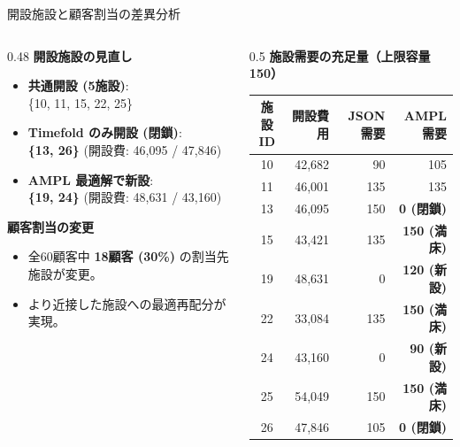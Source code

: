 \documentclass[aspectratio=169,11pt]{beamer}
\begin{document}
\begin{frame}{開設施設と顧客割当の差異分析}
  \begin{columns}[T]
    \begin{column}{0.48\textwidth}
      \textbf{開設施設の見直し}
      \begin{itemize}\footnotesize
        \item \textbf{共通開設 (5施設)}: \\
          \{10, 11, 15, 22, 25\}
        \item \textbf{Timefold のみ開設 (閉鎖)}: \\
          \alert{\textbf{\{13, 26\}}} (開設費: 46,095 / 47,846)
        \item \textbf{AMPL 最適解で新設}: \\
          \alert{\textbf{\{19, 24\}}} (開設費: 48,631 / 43,160)
      \end{itemize}
      \vspace{0.5em}
      \textbf{顧客割当の変更}
      \begin{itemize}\footnotesize
        \item 全60顧客中 \alert{\textbf{18顧客 (30\%)}} の割当先施設が変更。
        \item より近接した施設への最適再配分が実現。
      \end{itemize}
    \end{column}
    \begin{column}{0.5\textwidth}
      \textbf{施設需要の充足量（上限容量 150）}
      \begin{table}\tiny
        \centering
        \begin{tabular}{crrr}
          \toprule
          施設ID & 開設費用 & JSON需要 & AMPL需要 \\
          \midrule
          10 & 42,682 & 90 & 105 \\
          11 & 46,001 & 135 & 135 \\
          13 & 46,095 & 150 & \alert{\textbf{0 (閉鎖)}} \\
          15 & 43,421 & 135 & \textbf{150 (満床)} \\
          19 & 48,631 & 0 & \alert{\textbf{120 (新設)}} \\
          22 & 33,084 & 135 & \textbf{150 (満床)} \\
          24 & 43,160 & 0 & \alert{\textbf{90 (新設)}} \\
          25 & 54,049 & 150 & \textbf{150 (満床)} \\
          26 & 47,846 & 105 & \alert{\textbf{0 (閉鎖)}} \\
          \bottomrule
        \end{tabular}
      \end{table}
    \end{column}
  \end{columns}
\end{frame}
\end{document}

